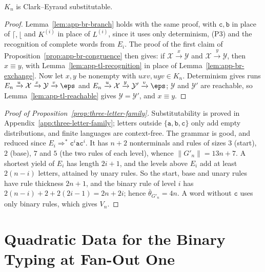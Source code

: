 \begin{proposition}\label{prop:app-tl-congruence}
$K_n$ is Clark--Eyraud substitutable.
\end{proposition}

\begin{proof}
Lemma~\ref{lem:app-br-branch} holds with the same proof, with $\mathtt c,\mathtt b$
in place of $\lceil,\lfloor$ and $K^{(i)}$ in place of $L^{(i)}$, since it uses only
determinism, (P3) and the recognition of complete words from $E_i$.  The proof
of the first claim of Proposition~\ref{prop:app-br-congruence} then gives: if
$\mathcal X\xrightarrow{x}\mathcal Y$ and $\mathcal X\xrightarrow{y}\mathcal Y$, then
$x\equiv y$, with Lemma~\ref{lem:app-tl-recognition} in place of
Lemma~\ref{lem:app-br-exchange}.  Now let $x,y$ be nonempty with
$uxv,uyv\in K_n$.  Determinism gives runs
$E_n\xrightarrow{u}\mathcal X\xrightarrow{x}\mathcal Y\xrightarrow{v}\eps$ and
$E_n\xrightarrow{u}\mathcal X\xrightarrow{y}\mathcal Y'\xrightarrow{v}\eps$; $\mathcal Y$ and
$\mathcal Y'$ are reachable, so Lemma~\ref{lem:app-tl-reachable} gives
$\mathcal Y=\mathcal Y'$, and $x\equiv y$.
\end{proof}

\begin{proof}[Proof of Proposition~\ref{prop:three-letter-family}]
Substitutability is proved in Appendix~\ref{app:three-letter-family}; letters
outside $\{\mathtt a,\mathtt b,\mathtt c\}$ only add empty distributions, and
finite languages are context-free.  The grammar is good, and reduced since
$E_i\Rightarrow^*\mathtt c^i\mathtt a\mathtt c^i$.  It has $n+2$ nonterminals
and rules of sizes $3$ (start), $2$ (base), $7$ and $5$ (the two rules of each
level), whence $\|G'_n\|=13n+7$.  A shortest yield of $E_i$ has length $2i+1$,
and the levels above $E_i$ add at least $2(n-i)$ letters, attained by unary
rules.  So the start, base and unary rules have rule thickness $2n+1$, and the
binary rule of level $i$ has $2(n-i)+2+2(2i-1)=2n+2i$; hence
$\bar\theta_{G'_n}=4n$.  A word without $\mathtt c$ uses only binary rules,
which gives $V_n$.
\end{proof}

\section{Quadratic Data for the Binary Typing at Fan-Out One}
\label{app:binary-u1-quadratic}

